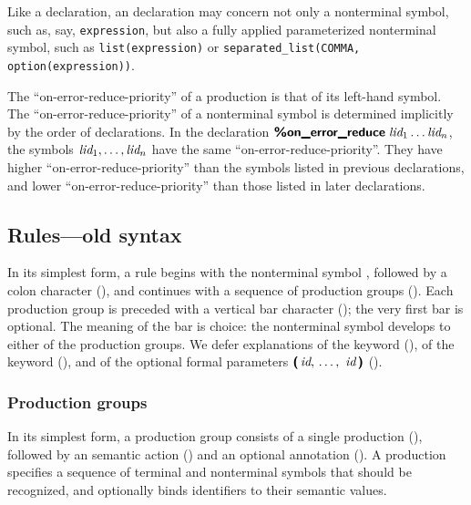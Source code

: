 \documentclass[onecolumn,11pt,nocopyrightspace,preprint]{sigplanconf}
\begin{document}

Like a \dtype declaration, an \donerrorreduce declaration may concern not only
a nonterminal symbol, such as, say, \texttt{expression}, but also a fully
applied parameterized nonterminal symbol, such as \texttt{list(expression)} or
\texttt{separated\_list(COMMA, option(expression))}.

The ``on-error-reduce-priority'' of a production is that of its left-hand
symbol. The ``on-error-reduce-priority'' of a nonterminal symbol is determined
implicitly by the order of \donerrorreduce declarations. In the declaration
$\text{\upshape\sf\bfseries \%on\_error\_reduce}\;\textit{lid}_1 \ldots \textit{lid}_n$, the symbols $\textit{lid}_1, \ldots,
\textit{lid}_n$ have the same ``on-error-reduce-priority''. They have higher
``on-error-reduce-priority'' than the symbols listed in previous
\donerrorreduce declarations, and lower ``on-error-reduce-priority''
than those listed in later \donerrorreduce declarations.

\subsection{Rules---old syntax}
\label{sec:old:rules}

In its simplest
form, a rule begins with the nonterminal symbol ,
followed by a colon character (\deuxpoints),
and continues with a sequence of production groups
(). Each production group is preceded with a
vertical bar character (\barre); the very first bar is optional. The meaning
of the bar is choice: the nonterminal symbol  develops to either of the
production groups. We defer explanations of the keyword \dpublic
(), of the keyword \dinline (), and of the
optional formal parameters $\tuple{\nt{id}}$
().

\subsubsection{Production groups}
\label{sec:productiongroups}

In its simplest form, a production group consists of a single production (),
followed by an \ocaml semantic action () and an optional
\dprec annotation (). A production specifies a sequence of terminal and
nonterminal symbols that should be recognized, and optionally binds
identifiers to their semantic values.
\end{document}
